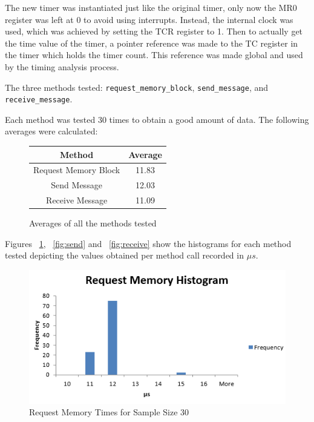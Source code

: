 \documentclass[se]{uw-wkrpt}
\begin{document}
The new timer was instantiated just like the original timer, only now the MR0 register was left at 0 to avoid using interrupts. Instead, the internal clock was used, which was achieved by setting the TCR register to 1. Then to actually get the time value of the timer, a pointer reference was made to the TC register in the timer which holds the timer count. This reference was made global and used by the timing analysis process. 

The three methods tested: \texttt{request\_memory\_block}, \texttt{send\_message}, and \texttt{receive\_message}. 

Each method was tested 30 times to obtain a good amount of data. 
The following averages were calculated:
\begin{figure}
\begin{center}
\begin{tabular}{|c|c|}
\hline
Method & Average\\
\hline
Request Memory Block & 11.83 \\
\hline
Send Message & 12.03 \\
\hline
Receive Message & 11.09\\
\hline
\end{tabular}
\end{center}
\caption{Averages of all the methods tested}
\end{figure}

Figures ~\ref{fig:mem}, ~\ref{fig:send} and ~\ref{fig:receive} show the histograms for each method tested depicting the values obtained per method call recorded in $\mu s$.

\begin{figure}[bp!]
\centering
\includegraphics[width=120mm]{RequestMemoryHistogram.png}
\caption{Request Memory Times for Sample Size 30}
\label{fig:mem}
\end{figure}
\end{document}
